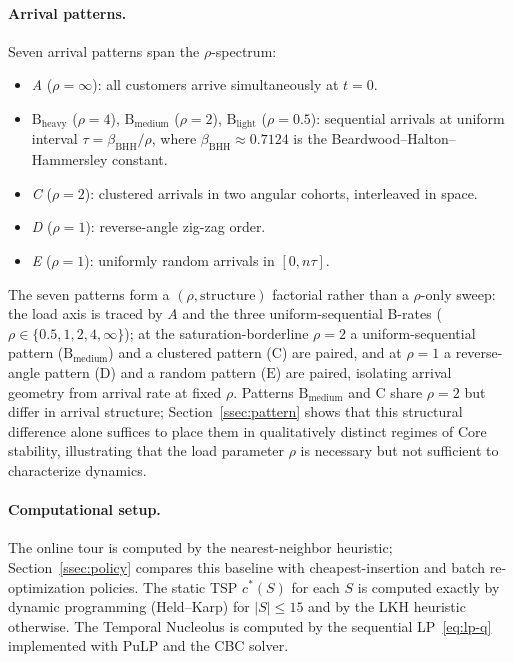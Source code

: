 \documentclass[11pt]{article}
\theoremstyle{plain}
\theoremstyle{definition}
\theoremstyle{remark}
\newcommand{\cstar}{c^{\ast}}
\begin{document}
\paragraph{Arrival patterns.} Seven arrival patterns span the $\rho$-spectrum:
\begin{itemize}
  \item \emph{A} ($\rho=\infty$): all customers arrive simultaneously at $t=0$.
  \item \emph{$\text{B}_{\text{heavy}}$} ($\rho=4$), \emph{$\text{B}_{\text{medium}}$} ($\rho=2$), \emph{$\text{B}_{\text{light}}$} ($\rho=0.5$): sequential arrivals at uniform interval $\tau=\beta_{\mathrm{BHH}}/\rho$, where $\beta_{\mathrm{BHH}}\approx 0.7124$ is the Beardwood--Halton--Hammersley constant.
  \item \emph{C} ($\rho=2$): clustered arrivals in two angular cohorts, interleaved in space.
  \item \emph{D} ($\rho=1$): reverse-angle zig-zag order.
  \item \emph{E} ($\rho=1$): uniformly random arrivals in $[0,n\tau]$.
\end{itemize}
The seven patterns form a $(\rho,\text{structure})$ factorial rather than a $\rho$-only sweep: the load axis is traced by $A$ and the three uniform-sequential B-rates ($\rho\in\{0.5,1,2,4,\infty\}$); at the saturation-borderline $\rho=2$ a uniform-sequential pattern ($\text{B}_{\text{medium}}$) and a clustered pattern ($\text{C}$) are paired, and at $\rho=1$ a reverse-angle pattern ($\text{D}$) and a random pattern ($\text{E}$) are paired, isolating arrival geometry from arrival rate at fixed $\rho$. Patterns $\text{B}_{\text{medium}}$ and $\text{C}$ share $\rho=2$ but differ in arrival structure; Section~\ref{ssec:pattern} shows that this structural difference alone suffices to place them in qualitatively distinct regimes of Core stability, illustrating that the load parameter $\rho$ is necessary but not sufficient to characterize dynamics.

\paragraph{Computational setup.} The online tour is computed by the nearest-neighbor heuristic; Section~\ref{ssec:policy} compares this baseline with cheapest-insertion and batch re-optimization policies. The static TSP $\cstar(S)$ for each $S$ is computed exactly by dynamic programming (Held--Karp) for $|S|\le 15$ and by the LKH heuristic \citep{helsgaun2000effective} otherwise. The Temporal Nucleolus is computed by the sequential LP~\eqref{eq:lp-q} implemented with PuLP and the CBC solver.
\end{document}
